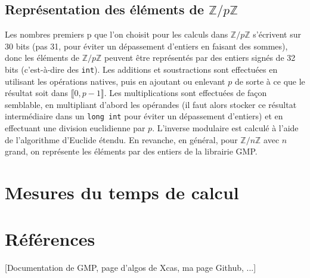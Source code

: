 \documentclass[french]{article}
\begin{document}
\subsection{Représentation des éléments de $\mathbb{Z}/p\mathbb{Z}$}
Les nombres premiers p que l'on choisit pour les calculs dans $\mathbb{Z}/p\mathbb{Z}$ s'écrivent sur 30 bits (pas 31, pour éviter un dépassement d'entiers en faisant des sommes), donc les éléments de $\mathbb{Z}/p\mathbb{Z}$ peuvent être représentés par des entiers signés de 32 bits (c'est-à-dire des {\tt int}).
Les additions et soustractions sont effectuées en utilisant les opérations natives, puis en ajoutant ou enlevant $p$ de sorte à ce que le résultat soit dans $\llbracket0,p-1\rrbracket$.
Les multiplications sont effectuées de façon semblable, en multipliant d'abord les opérandes (il faut alors stocker ce résultat intermédiaire dans un {\tt long int} pour éviter un dépassement d'entiers) et en effectuant une division euclidienne par $p$.
L'inverse modulaire est calculé à l'aide de l'algorithme d'Euclide étendu.
\newline
En revanche, en général, pour $\mathbb{Z}/n\mathbb{Z}$ avec $n$ grand, on représente les éléments par des entiers de la librairie GMP.
\section{Mesures du temps de calcul}
\section{Références}
[Documentation de GMP, page d'algos de Xcas, ma page Github, ...]
\end{document}
